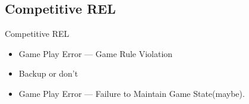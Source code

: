 \documentclass[utf8x]{beamer}
\begin{document}
  \subsection*{Competitive REL}
    \begin{frame}{Competitive REL}
      \begin{itemize}
        \item Game Play Error — Game Rule Violation \pause
        \item Backup \pause or don't \pause
        \item Game Play Error — Failure to Maintain Game State\pause (maybe).
      \end{itemize}
    \end{frame}


    \begin{frame}[plain]
      \titlepage
    \end{frame}
  
\end{document}
